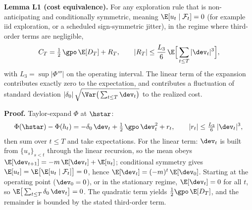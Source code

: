 \textbf{Lemma L1 (cost equivalence).} For any exploration rule that is
non-anticipating and conditionally symmetric, meaning
$\E[u_t \mid \mathcal{F}_t] = 0$ (for example iid exploration, or a
scheduled sign-symmetric jitter), in the regime where third-order terms are
negligible,
\begin{equation*}
  C_T = \tfrac{1}{2}\,\gpo\,\E[D_T] + R_T, \qquad
  |R_T| \le \frac{L_3}{6}\,\E\Big[\sum_{t\le T} |\dev_t|^3\Big],
\end{equation*}
with $L_3 = \sup |\Phi'''|$ on the operating interval. The linear term of
the expansion contributes exactly zero to the expectation, and contributes
a fluctuation of standard deviation
$|\delta_0|\,\sqrt{\Var\big(\sum_{t\le T}\dev_t\big)}$ to the realized
cost.

\textbf{Proof.} Taylor-expand $\Phi$ at $\hstar$:
\begin{equation*}
  \Phi(\hstar) - \Phi(h_t)
  = -\delta_0\,\dev_t + \tfrac{1}{2}\,\gpo\,\dev_t^2 + r_t,
  \qquad |r_t| \le \tfrac{L_3}{6}\,|\dev_t|^3,
\end{equation*}
then sum over $t \le T$ and take expectations. For the linear term: $\dev_t$
is built from $\{u_s\}_{s<t}$ through the linear recursion, so the mean
obeys $\E[\dev_{t+1}] = -m\,\E[\dev_t] + \E[u_t]$; conditional symmetry
gives $\E[u_t] = \E\big[\E[u_t \mid \mathcal{F}_t]\big] = 0$, hence
$\E[\dev_t] = (-m)^t\,\E[\dev_0]$. Starting at the operating point
($\dev_0 = 0$), or in the stationary regime, $\E[\dev_t] = 0$ for all $t$,
so $\E\big[\sum_{t\le T} \delta_0\,\dev_t\big] = 0$. The quadratic term
yields $\tfrac{1}{2}\gpo\,\E[D_T]$, and the remainder is bounded by the
stated third-order term. \qedsymbol

